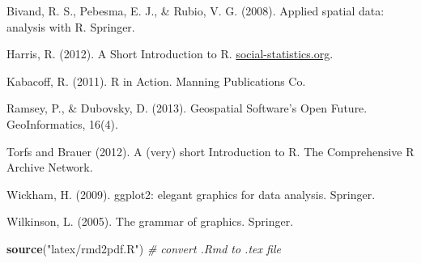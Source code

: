 \documentclass[]{article}
\newenvironment{Shaded}{}{}
\newcommand{\KeywordTok}[1]{\textcolor[rgb]{0.00,0.44,0.13}{\textbf{{#1}}}}
\newcommand{\StringTok}[1]{\textcolor[rgb]{0.25,0.44,0.63}{{#1}}}
\newcommand{\CommentTok}[1]{\textcolor[rgb]{0.38,0.63,0.69}{\textit{{#1}}}}
\newcommand{\NormalTok}[1]{{#1}}
\begin{document}
Bivand, R. S., Pebesma, E. J., \& Rubio, V. G. (2008). Applied spatial
data: analysis with R. Springer.

Harris, R. (2012). A Short Introduction to R.
\href{http://www.social-statistics.org/}{social-statistics.org}.

Kabacoff, R. (2011). R in Action. Manning Publications Co.

Ramsey, P., \& Dubovsky, D. (2013). Geospatial Software's Open Future.
GeoInformatics, 16(4).

Torfs and Brauer (2012). A (very) short Introduction to R. The
Comprehensive R Archive Network.

Wickham, H. (2009). ggplot2: elegant graphics for data analysis.
Springer.

Wilkinson, L. (2005). The grammar of graphics. Springer.

\begin{Shaded}
\begin{Highlighting}[]
\KeywordTok{source}\NormalTok{(}\StringTok{"latex/rmd2pdf.R"}\NormalTok{)  }\CommentTok{# convert .Rmd to .tex file}
\end{Highlighting}
\end{Shaded}
\end{document}
